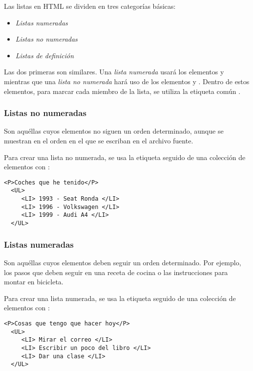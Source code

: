 Las listas en HTML se dividen en tres categorías básicas:

\begin{itemize}
\item \textit{Listas numeradas}
\item \textit{Listas no numeradas}
\item \textit{Listas de definición}
\end{itemize}

Las dos primeras son similares.  Una \textit{lista numerada} usará los
elementos   y   mientras  que una  \textit{lista no
numerada} hará uso de los  elementos  y . Dentro de
estos elementos, para  marcar cada miembro de la lista,  se utiliza la
etiqueta común .

\subsubsection*{Listas no numeradas}

Son aquéllas cuyos elementos no siguen un orden determinado, aunque se
muestran en el orden en el que se escriban en el archivo fuente.

Para crear una lista no numerada, se usa la etiqueta  seguido
de una colección de elementos con :

\begin{verbatim}
<P>Coches que he tenido</P>
  <UL>
     <LI> 1993 - Seat Ronda </LI>
     <LI> 1996 - Volkswagen </LI>
     <LI> 1999 - Audi A4 </LI>
  </UL>
\end{verbatim}


\subsubsection*{Listas numeradas}

Son aquéllas  cuyos elementos deben  seguir un orden  determinado. Por
ejemplo, los  pasos que  deben seguir  en una receta  de cocina  o las
instrucciones para montar en bicicleta.

Para crear una lista numerada, se usa la etiqueta  seguido de
una colección de elementos con :

\begin{verbatim}
<P>Cosas que tengo que hacer hoy</P>
  <UL>
     <LI> Mirar el correo </LI>
     <LI> Escribir un poco del libro </LI>
     <LI> Dar una clase </LI>
  </UL>
\end{verbatim}

